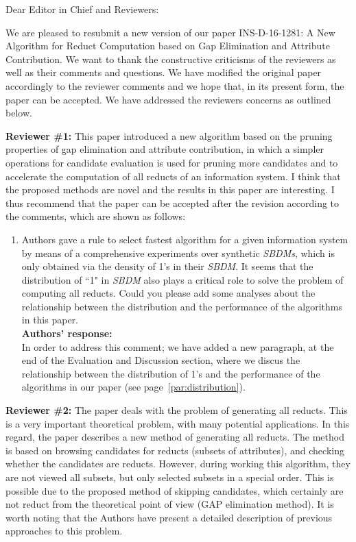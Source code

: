 \documentclass{letter}
\begin{document}
\begin{letter}{}
  \opening{Dear Editor in Chief and Reviewers:}

  We are pleased to resubmit a new version of our paper INS-D-16-1281: A New Algorithm for Reduct Computation based on Gap Elimination and Attribute Contribution. We want to thank the constructive criticisms of the reviewers as well as their comments and questions. We have modified the original paper accordingly to the reviewer comments and we hope that, in its present form, the paper can be accepted. We have addressed the reviewers concerns as outlined below.

  \textbf{Reviewer \#1:} 
  This paper introduced a new algorithm based on the pruning properties of gap elimination and attribute contribution, in which a simpler operations for candidate evaluation is used for pruning more candidates and to accelerate the computation of all reducts of an information system. I think that the proposed methods are novel and the results in this paper are interesting. I thus recommend that the paper can be accepted after the revision according to the comments, which are shown as follows:

  \begin{enumerate}
    \item Authors gave a rule to select fastest algorithm for a given information system by means of a comprehensive experiments over synthetic \textit{SBDMs}, which is only obtained via the density of 1's in their \textit{SBDM}. It seems that the distribution of ``1" in \textit{SBDM} also plays a critical role to solve the problem of computing all reducts. Could you please add some analyses about the relationship between the distribution and the performance of the algorithms in this paper.\\
    \textbf{Authors’ response:} \\
    In order to address this comment; we have added a new paragraph, at the end of the Evaluation and Discussion section, where we discus the relationship between the distribution of 1's and the performance of the algorithms in our paper (see page~\ref{par:distribution}).
  \end{enumerate}
  
  \textbf{Reviewer \#2:}
  The paper deals with the problem of generating all reducts. This is a very important theoretical problem, with many potential applications. In this regard, the paper describes a new method of generating all reducts. The method is based on browsing candidates for reducts (subsets of attributes), and checking whether the candidates are reducts. However, during working this algorithm, they are not viewed all subsets, but only selected subsets in a special order. This is possible due to the proposed method of skipping candidates, which certainly are not reduct from the theoretical point of view (GAP elimination method).
  It is worth noting that the Authors have present a detailed description of previous approaches to this problem.
  

\end{letter}
\end{document}
